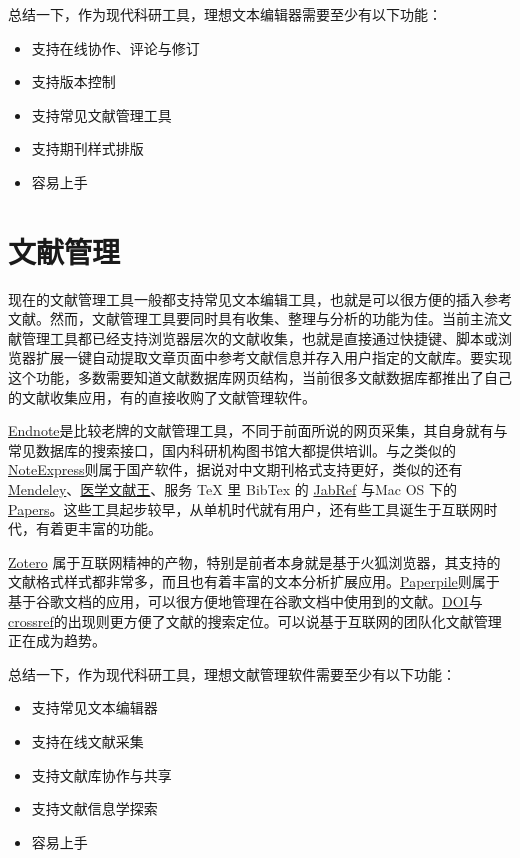 \documentclass[]{tufte-book}
\providecommand{\tightlist}{%
  \setlength{\itemsep}{0pt}\setlength{\parskip}{0pt}}
\begin{document}
总结一下，作为现代科研工具，理想文本编辑器需要至少有以下功能：

\begin{itemize}
\tightlist
\item
  支持在线协作、评论与修订
\item
  支持版本控制
\item
  支持常见文献管理工具
\item
  支持期刊样式排版
\item
  容易上手
\end{itemize}

\hypertarget{ux6587ux732eux7ba1ux7406-1}{%
\section*{文献管理}\label{ux6587ux732eux7ba1ux7406-1}}

现在的文献管理工具一般都支持常见文本编辑工具，也就是可以很方便的插入参考文献。然而，文献管理工具要同时具有收集、整理与分析的功能为佳。当前主流文献管理工具都已经支持浏览器层次的文献收集，也就是直接通过快捷键、脚本或浏览器扩展一键自动提取文章页面中参考文献信息并存入用户指定的文献库。要实现这个功能，多数需要知道文献数据库网页结构，当前很多文献数据库都推出了自己的文献收集应用，有的直接收购了文献管理软件。

\href{https://endnote.com/}{Endnote}是比较老牌的文献管理工具，不同于前面所说的网页采集，其自身就有与常见数据库的搜索接口，国内科研机构图书馆大都提供培训。与之类似的\href{http://www.inoteexpress.com/aegean/}{NoteExpress}则属于国产软件，据说对中文期刊格式支持更好，类似的还有\href{https://www.mendeley.com/}{Mendeley}、\href{http://refer.medlive.cn/}{医学文献王}、服务 TeX 里 BibTex 的 \href{http://www.jabref.org/}{JabRef} 与Mac OS 下的\href{https://www.readcube.com/papers/mac}{Papers}。这些工具起步较早，从单机时代就有用户，还有些工具诞生于互联网时代，有着更丰富的功能。

\href{https://www.zotero.org/}{Zotero} 属于互联网精神的产物，特别是前者本身就是基于火狐浏览器，其支持的文献格式样式都非常多，而且也有着丰富的文本分析扩展应用。\href{https://paperpile.com/app}{Paperpile}则属于基于谷歌文档的应用，可以很方便地管理在谷歌文档中使用到的文献。\href{https://www.doi.org/}{DOI}与\href{https://www.crossref.org/}{crossref}的出现则更方便了文献的搜索定位。可以说基于互联网的团队化文献管理正在成为趋势。

总结一下，作为现代科研工具，理想文献管理软件需要至少有以下功能：

\begin{itemize}
\tightlist
\item
  支持常见文本编辑器
\item
  支持在线文献采集
\item
  支持文献库协作与共享
\item
  支持文献信息学探索
\item
  容易上手
\end{itemize}
\end{document}
